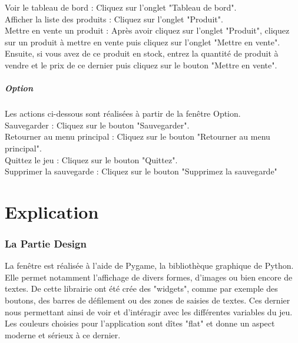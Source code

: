 Voir le tableau de bord : Cliquez sur l'onglet "Tableau de bord". \\

Afficher la liste des produits : Cliquez sur l'onglet "Produit". \\

Mettre en vente un produit : Après avoir cliquez sur l'onglet "Produit", cliquez sur un produit à mettre en vente puis cliquez sur l'onglet "Mettre en vente". Ensuite, si vous avez de ce produit en stock, entrez la quantité de produit à vendre et le prix de ce dernier puis cliquez sur le bouton "Mettre en vente". \\



\subsubsection*{Option}



Les actions ci-dessous sont réalisées à partir de la fenêtre Option.\\

Sauvegarder : Cliquez sur le bouton "Sauvegarder". \\

Retourner au menu principal : Cliquez sur le bouton "Retourner au menu principal". \\

Quittez le jeu : Cliquez sur le bouton "Quittez". \\

Supprimer la sauvegarde : Cliquez sur le bouton "Supprimez la sauvegarde"













\part{Explication}



\setcounter{section}{0}



\section{La Partie Design}

La fenêtre est réalisée à l'aide de Pygame, la bibliothèque graphique de Python. Elle permet notamment l'affichage de divers formes, d'images ou bien encore de textes. De cette librairie ont été crée des "widgets", comme par exemple des boutons, des barres de défilement ou des zones de saisies de textes. Ces dernier nous permettant ainsi de voir et d'intéragir avec les différentes variables du jeu. \\
Les couleurs choisies pour l'application sont dîtes "flat" et donne un aspect moderne et sérieux à ce dernier.


